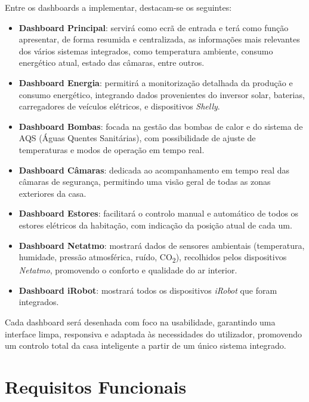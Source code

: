 Entre os dashboards a implementar, destacam-se os seguintes:
\begin{itemize}
    \item \textbf{Dashboard Principal}: servirá como ecrã de entrada e terá como função apresentar, de forma resumida e centralizada, as informações mais relevantes dos vários sistemas integrados, como temperatura ambiente, consumo energético atual, estado das câmaras, entre outros.
    \item \textbf{Dashboard Energia}: permitirá a monitorização detalhada da produção e consumo energético, integrando dados provenientes do inversor solar, baterias, carregadores de veículos elétricos, e dispositivos \textit{Shelly}.
    \item \textbf{Dashboard Bombas}: focada na gestão das bombas de calor e do sistema de AQS (Águas Quentes Sanitárias), com possibilidade de ajuste de temperaturas e modos de operação em tempo real.
    \item \textbf{Dashboard Câmaras}: dedicada ao acompanhamento em tempo real das câmaras de segurança, permitindo uma visão geral de todas as zonas exteriores da casa.
    \item \textbf{Dashboard Estores}: facilitará o controlo manual e automático de todos os estores elétricos da habitação, com indicação da posição atual de cada um.
    \item \textbf{Dashboard Netatmo}: mostrará dados de sensores ambientais (temperatura, humidade, pressão atmosférica, ruído, CO\textsubscript{2}), recolhidos pelos dispositivos \textit{Netatmo}, promovendo o conforto e qualidade do ar interior.
    \item \textbf{Dashboard iRobot}: mostrará todos os dispositivos \textit{iRobot} que foram integrados.
\end{itemize}

Cada dashboard será desenhada com foco na usabilidade, garantindo uma interface limpa, responsiva e adaptada às necessidades do utilizador, promovendo um controlo total da casa inteligente a partir de um único sistema integrado.

\newpage

\section{Requisitos Funcionais}

